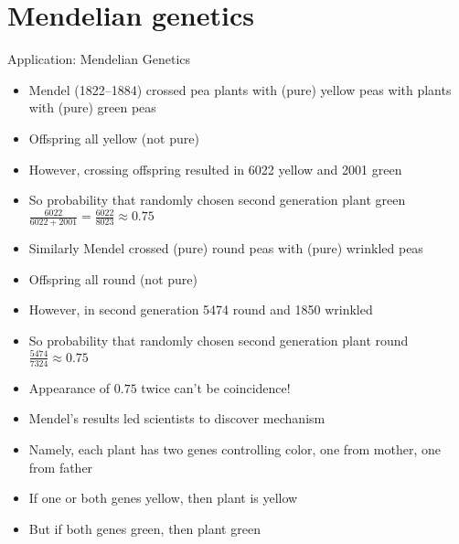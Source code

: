 \documentclass{beamer}
\theoremstyle{definition}
\begin{document}
\section{Mendelian genetics}
\begin{frame}{Application: Mendelian Genetics}
\begin{itemize}
\item Mendel (1822--1884) crossed pea plants with (pure) yellow peas
with plants with (pure) green peas
\item Offspring all yellow (not pure)
\item However, crossing offspring resulted in 
6022 yellow and 2001 green
\item So probability that randomly chosen second generation plant green
$\frac{6022}{6022+2001}=\frac{6022}{8023}\approx 0.75$
\end{itemize}
\end{frame}
\begin{frame}
\begin{itemize}
\item Similarly Mendel crossed (pure) round peas with (pure) wrinkled peas
\item Offspring all round (not pure)
\item However, in second generation 5474 round and 1850 wrinkled
\item So probability that randomly chosen second generation plant round
$\frac{5474}{7324}\approx 0.75$
\end{itemize}
\end{frame}
\begin{frame}
\begin{itemize}
\item Appearance of $0.75$ twice can't be coincidence!
\item Mendel's results led scientists to discover mechanism
\item Namely, each plant has two genes controlling color, one
from mother, one from father
\item If one or both genes yellow, then plant is yellow
\item But if both genes green, then plant green
\end{itemize}
\end{frame}
\end{document}
